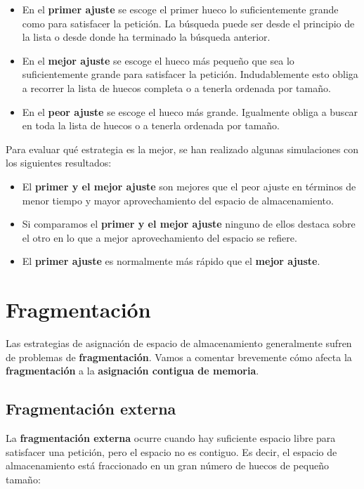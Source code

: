 \begin{itemize}
\item
  En el \textbf{{}primer ajuste}{} se escoge el primer hueco lo
  suficientemente grande como para satisfacer la petición. La búsqueda
  puede ser desde el principio de la lista o desde donde ha terminado la
  búsqueda anterior.
\item
  En el \textbf{{}mejor ajuste}{} se escoge el hueco más pequeño que sea
  lo suficientemente grande para satisfacer la petición. Indudablemente
  esto obliga a recorrer la lista de huecos completa o a tenerla
  ordenada por tamaño.
\item
  En el \textbf{{}peor ajuste}{} se escoge el hueco más grande.
  Igualmente obliga a buscar en toda la lista de huecos o a tenerla
  ordenada por tamaño.
\end{itemize}

Para evaluar qué estrategia es la mejor, se han realizado algunas
simulaciones con los siguientes resultados:

\begin{itemize}
\item
  El \textbf{primer y el mejor ajuste} son mejores que el peor ajuste en
  términos de menor tiempo y mayor aprovechamiento del espacio de
  almacenamiento.
\item
  Si comparamos el \textbf{primer y el mejor ajuste} ninguno de ellos
  destaca sobre el otro en lo que a mejor aprovechamiento del espacio se
  refiere.
\item
  El \textbf{primer ajuste} es normalmente más rápido que el
  \textbf{mejor ajuste}.
\end{itemize}

\section{Fragmentación}\label{_fragmentaciuxf3n}

{} Las estrategias de asignación de espacio de almacenamiento
generalmente sufren de problemas de \textbf{fragmentación}. Vamos a
comentar brevemente cómo afecta la \textbf{fragmentación} a la
\textbf{asignación contigua de memoria}.

\subsection{Fragmentación externa}\label{_fragmentaciuxf3n_externa}

{} La \textbf{fragmentación externa} ocurre cuando hay suficiente
espacio libre para satisfacer una petición, pero el espacio no es
contiguo. Es decir, el espacio de almacenamiento está fraccionado en un
gran número de huecos de pequeño tamaño:

